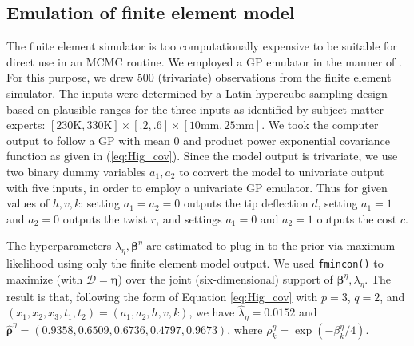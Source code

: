 \documentclass[12pt]{article}
\begin{document}
\subsection{Emulation of finite element model}\label{emulator}
The finite element simulator is too computationally expensive to be suitable for direct use in an MCMC routine. 
%
We employed a GP emulator in the manner of \cite{Williams2006}. 
%
For this purpose, we drew 500 (trivariate) observations from the finite element simulator. 
%
The inputs were determined by a Latin hypercube sampling design \citep{McKay1979} based on plausible ranges for the three inputs as identified by subject matter experts: $[230\mathrm{K}, 330\mathrm{K}] \times [.2,.6]\times[10\mathrm{mm},25\mathrm{mm}]$.
%
We took the computer output to follow a GP with mean 0 and product power exponential covariance function as given in (\ref{eq:Hig_cov}).
%
Since the model output is trivariate, we use two binary dummy variables $a_1,a_2$ to convert the model to univariate output with five inputs, in order to employ a univariate GP emulator.
% 
Thus for given values of $h,v,k$: setting $a_1=a_2=0$ outputs the tip deflection $d$, setting $a_1=1$ and $a_2=0$ outputs the twist $r$, and settings $a_1=0$ and $a_2=1$ outputs the cost $c$.

The hyperparameters $\lambda_\eta,\boldsymbol \beta^\eta$ are estimated to plug in to the prior
% 
via maximum likelihood using only the finite element model output.
% 
%
We used \texttt{fmincon()} \citep{MATLAB2017} %
to maximize (with $\mathcal D=\boldsymbol\eta$) over the joint (six-dimensional) support of $\boldsymbol \beta^\eta,\lambda_\eta$.  
%
The result is that, following the form of Equation \eqref{eq:Hig_cov} with $p=3$, $q=2$, and $(x_1,x_2,x_3,t_1,t_2)=(a_1,a_2,h,v,k)$, we have $\hat\lambda_\eta = 0.0152$ and $\boldsymbol {\hat\rho}^\eta = (0.9358, 0.6509, 0.6736, 0.4797, 0.9673)$, 
where $\rho^\eta_k = \exp(-\beta_k^\eta/4)$.
%
\end{document}
